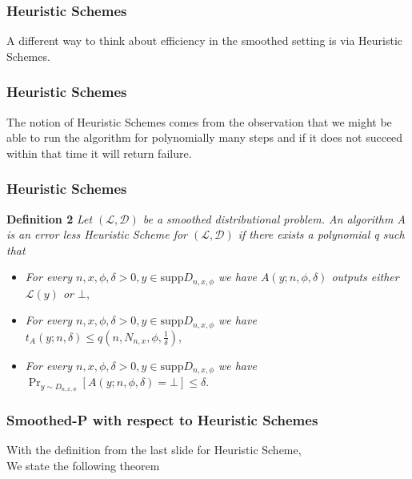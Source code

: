 \begin{frame}
    \frametitle{Heuristic Schemes}

    \begin{center}
        A different way to think about efficiency in the smoothed setting is via Heuristic Schemes.
    \end{center}
\end{frame}

\begin{frame}
    \frametitle{Heuristic Schemes}

    \begin{center}
        The notion of Heuristic Schemes comes from the observation that we might be able to run the algorithm for
        polynomially many steps and if it does not succeed within that time it will return failure.
    \end{center}
\end{frame}

\begin{frame}
    \frametitle{Heuristic Schemes}

    \textbf{Definition 2} \textit{Let $(\mathcal{L}, \mathcal{D})$ be a smoothed distributional problem. An algorithm A is an error less Heuristic Scheme for
        $(\mathcal{L}, \mathcal{D})$ if there exists a polynomial q such that}

    \begin{itemize}
        \item \textit{For every $n, x, \phi, \delta > 0, y \in \text{supp}D_{n, x, \phi}$ we have $A(y; n, \phi, \delta)$ outputs either $\mathcal{L}(y)$ or $\bot$},
        \item \textit{For every $n, x, \phi, \delta > 0, y \in \text{supp}D_{n, x, \phi}$ we have $t_A(y; n, \delta) \leq q(n, N_{n,x},\phi, \frac{1}{\delta})$},
        \item \textit{For every $n, x, \phi, \delta > 0, y \in \text{supp}D_{n, x, \phi}$ we have $\Pr_{y \sim D_{n, x, \phi}}[A(y; n, \phi, \delta) = \bot] \leq \delta$}.
    \end{itemize}
\end{frame}

\begin{frame}
    \frametitle{\textsf{Smoothed-P} with respect to Heuristic Schemes}

    \begin{center}
        With the definition from the last slide for Heuristic Scheme,\\We state the following theorem
    \end{center}

\end{frame}

